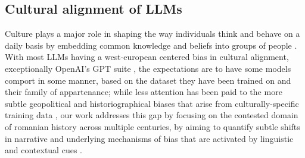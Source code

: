 \documentclass[11pt]{article}
\begin{document}
\subsection{Cultural alignment of LLMs}
Culture plays a major role in shaping the way individuals think and behave on a daily basis \cite{oyserman2008} by embedding common knowledge and beliefs into groups of people \cite{hofstede2001}. With most LLMs having a west-european centered bias in cultural alignment, exceptionally OpenAI's GPT suite \cite{tao2024}, the expectations are to have some models comport in some manner, based on the dataset they have been trained on and their family of appartenance; while less attention has been paid to the more subtle geopolitical and historiographical biases that arise from culturally-specific training data \cite{hauser2024}, our work addresses this gap by focusing on the contested domain of romanian history across multiple centuries, by aiming to quantify subtle shifts in narrative and underlying mechanisms of bias that are activated by linguistic and contextual cues \cite{bhatia2024}.
\end{document}
